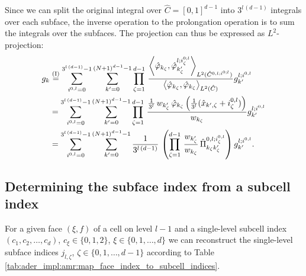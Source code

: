 \documentclass{scrreprt}
\theoremstyle{definition}
\theoremstyle{nonumberplain}
\begin{document}
Since we can split the original integral over $\hat{C}=[0,1]^{d-1}$
into $3^{l\,(d-1)}$ integrals over each subface, the inverse operation
to the prolongation operation is to sum the integrals
over the subfaces.
The projection can thus be expressed as $L^2$-projection:
\begin{align} 
g_k
&\overset{\textup{(I)}}{=}
\sum_{i^{0,l}=0}^{3^{l\,(d-1)}-1}
\sum_{k'=0}^{(N+1)^{d-1}-1}
\prod_{\zeta=1}^{d-1}\,
\frac{
\left\langle
\hat{\varphi}_{k_\zeta},
\hat{\varphi}_{k'_\zeta}^{l;i^{0;l}_\zeta}
\right\rangle
_{L^2(\hat{C}^{0,l;i^{0;l}})}
}
{
\left\langle
\hat{\varphi}_{k_\zeta},
\hat{\varphi}_{k_\zeta}
\right\rangle
_{L^2(\hat{C})}
}
g^{l;i^{0,l}}_{k'}
\\
&=
\sum_{i^{0,l}=0}^{3^{l\,(d-1)}-1}
\sum_{k'=0}^{(N+1)^{d-1}-1}
\prod_{\zeta=1}^{d-1}\,
\frac{
\frac{1}{3^{l}}\,
w_{k'_\zeta}\,
\hat{\varphi}_{k_\zeta}
\left(
\frac{1}{3^{l}} (\hat{x}_{k',\zeta}+i_\zeta^{0,l})
\right)
}
{
w_{k_\zeta}
}
g^{l;i^{0,l}}_{k'}
\\
&=
\sum_{i^{0,l}=0}^{3^{l\,(d-1)}-1}
\sum_{k'=0}^{(N+1)^{d-1}-1}
\frac{1}{3^{l\,(d-1)}}\,
\left(
\prod_{\zeta=1}^{d-1}\,
\frac{w_{k'_\zeta}}{w_{k_\zeta}}\,
\hat{\Pi}^{0,l;i^{0,l}_\zeta}_{k_\zeta k'_\zeta}
\right)
g^{l;i^{0,l}}_{k'}.
\end{align}
\subsection{Determining the subface index from a subcell index}
For a given face $(\xi,f)$ of a cell on level $l-1$ and a single-level subcell
index $(c_1,c_2,\ldots,c_{d})$, $c_{\xi}\in\{0,1,2\}$,
$\xi\in\{0,1,\ldots,d\}$ we can reconstruct the single-level subface indices
$j_{l,\zeta}$, $\zeta\in\{0,1,\ldots,d-1\}$ according to Table
\ref{tab:ader_impl:amr:map_face_index_to_subcell_indices}.
\end{document}

